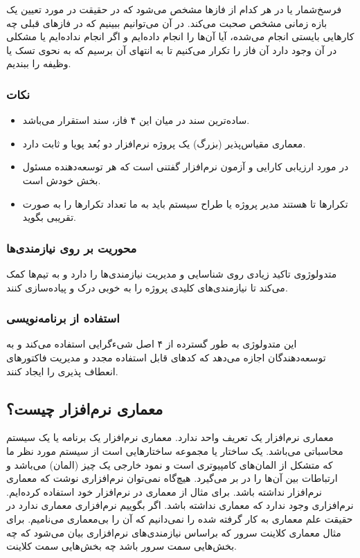 \documentclass[a4paper]{article}
\begin{document}
فرسخ‌شمار یا  در هر کدام از فاز‌ها مشخص می‌شود که در حقیقت در مورد
تعیین یک بازه زمانی مشخص صحبت می‌کند. در آن می‌توانیم ببینیم که در فاز‌های قبلی
چه کار‌هایی بایستی انجام می‌شده، آیا آن‌ها را انجام داده‌ایم و اگر انجام
نداده‌ایم یا مشکلی در آن وجود دارد آن فاز را تکرار می‌کنیم تا به انتهای آن برسیم
که به نحوی تسک یا وظیفه را ببندیم.

\subsubsection*{نکات}

\begin{itemize}
    \item ساده‌ترین سند در میان این ۴ فاز، سند استقرار می‌باشد.
    \item معماری مقیاس‌پذیر (بزرگ) یک پروژه نرم‌افزار دو بُعد پویا و ثابت دارد.
    \item در مورد ارزیابی کارایی و آزمون نرم‌افزار گفتنی است که هر توسعه‌دهنده
    مسئول  بخش خودش است.
    \item تکرار‌ها  تا هستند مدیر پروژه یا طراح سیستم باید به ما تعداد
    تکرار‌ها را به صورت تقریبی بگوید.
\end{itemize}

\subsubsection{محوریت بر روی نیازمندی‌ها}

متدولوژوی  تاکید زیادی روی شناسایی و مدیریت نیازمندی‌ها را دارد و به
تیم‌ها کمک می‌‌کند تا نیازمندی‌های کلیدی پروژه‌ را به خوبی درک و پیاده‌سازی
کنند.

\subsubsection{استفاده از برنامه‌نویسی }

این متدولوژی به طور گسترده از ۴ اصل شیء‌گرایی استفاده می‌کند و به توسعه‌دهندگان
اجازه می‌دهد که کد‌های قابل استفاده مجدد و مدیریت فاکتور‌های انعطاف پذیری را
ایجاد کنند.

\subsection{معماری نرم‌افزار چیست؟}

معماری نرم‌افزار یک تعریف واحد ندارد. معماری نرم‌افزار یک برنامه یا یک سیستم
محاسباتی می‌باشد. یک ساختار یا مجموعه ساختار‌هایی است از سیستم مورد نظر ما که
متشکل از المان‌های کامپیوتری است و نمود خارجی یک چیز (المان) می‌باشد و ارتباطات
بین آن‌ها را در بر می‌گیرد. هیچ‌گاه نمی‌توان نرم‌افزاری نوشت که معماری نرم‌افزار
نداشته باشد. برای مثال از معماری  در نرم‌افزار خود استفاده کرده‌ایم.
نرم‌افزاری وجود ندارد که معماری نداشته باشد. اگر بگوییم نرم‌افزاری معماری ندارد
در حقیقت علم معماری به کار گرفته شده را نمی‌دانیم که آن را بی‌معماری می‌نامیم.
برای مثال معماری کلاینت سرور که براساس نیازمندی‌های نرم‌افزاری بیان می‌شود که چه
بخش‌هایی سمت سرور باشد چه‌ بخش‌هایی سمت کلاینت.
\end{document}
